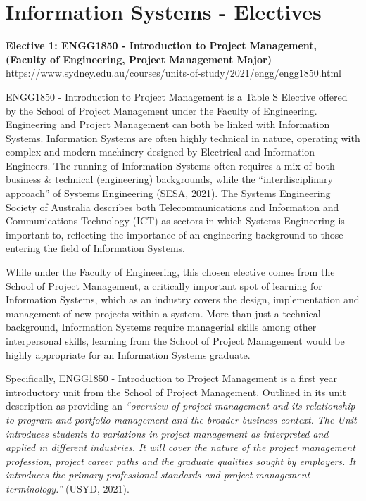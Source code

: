 \section{\textbf{Information Systems - Electives}}

\textbf{Elective 1: ENGG1850 - Introduction to Project Management, (Faculty of Engineering, Project Management Major)}
https://www.sydney.edu.au/courses/units-of-study/2021/engg/engg1850.html


ENGG1850 - Introduction to Project Management is a Table S Elective offered by the School of Project Management under the Faculty of Engineering. Engineering and Project Management can both be linked with Information Systems. Information Systems are often highly technical in nature, operating with complex and modern machinery designed by Electrical and Information Engineers. The running of Information Systems often requires a mix of both business & technical (engineering) backgrounds, while the “interdisciplinary approach” of Systems Engineering  (SESA, 2021). The Systems Engineering Society of Australia describes both Telecommunications and Information and Communications Technology (ICT) as sectors in which Systems Engineering is important to, reflecting the importance of an engineering background to those entering the field of Information Systems.

While under the Faculty of Engineering, this chosen elective comes from the School of Project Management, a critically important spot of learning for Information Systems, which as an industry covers the design, implementation and management of new projects within a system. More than just a technical background, Information Systems require managerial skills among other interpersonal skills, learning from the School of Project Management would be highly appropriate for an Information Systems graduate.


Specifically, ENGG1850 - Introduction to Project Management is a first year introductory unit from the School of Project Management. Outlined in its unit description as providing an \textit{“overview of project management and its relationship to program and portfolio management and the broader business context. The Unit introduces students to variations in project management as interpreted and applied in different industries. It will cover the nature of the project management profession, project career paths and the graduate qualities sought by employers. It introduces the primary professional standards and project management terminology.”} (USYD, 2021). 

